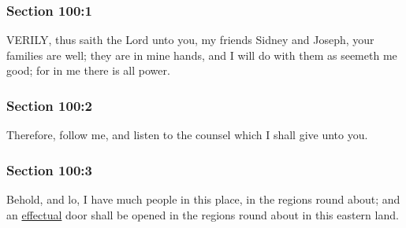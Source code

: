 	\subsubsection{Section 100:1} %
		\label{DC100-1}

		VERILY, thus saith the Lord unto you, my friends Sidney and Joseph, your families are well; they are in mine hands, and I will do with them as seemeth me good; for in me there is all power.


	\subsubsection{Section 100:2} %
		\label{DC100-2}

		Therefore, follow me, and listen to the counsel which I shall give unto you.


	\subsubsection{Section 100:3} %
		\label{DC100-3}

		Behold, and lo, I have much people in this place, in the regions round about; and an \hyperref[EFFECTUAL]{effectual} door shall be opened in the regions round about in this eastern land.


